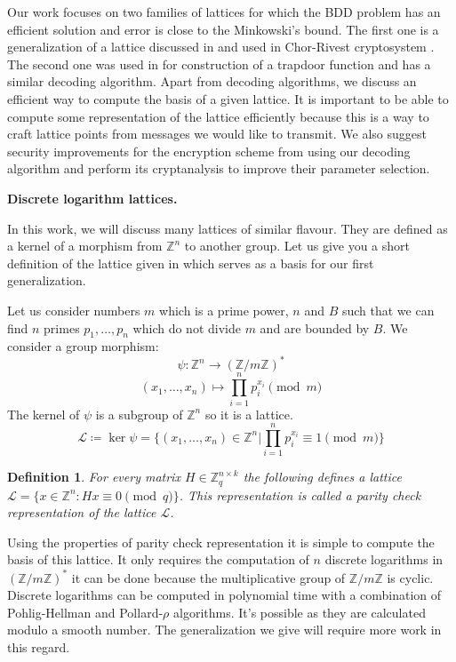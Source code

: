 \documentclass[12pt]{article}
\newcommand{\ZZ}{\mathbb{Z}}
\newcommand{\LL}{\mathcal{L}}
\newtheorem{definition}{Definition}
\begin{document}
Our work focuses on two families of lattices for which the BDD problem has an efficient solution and error is close to the Minkowski's bound. The first one is a generalization of a lattice discussed in \cite{[DP19]} and used in Chor-Rivest cryptosystem \cite{[CR88]}. The second one was used in \cite{[LLXY17]} for construction of a trapdoor function and has a similar decoding algorithm. Apart from decoding algorithms, we discuss an efficient way to compute the basis of a given lattice. It is important to be able to compute some representation of the lattice efficiently because this is a way to craft lattice points from messages we would like to transmit. We also suggest security improvements for the encryption scheme from \cite{[LLXY17]} using our decoding algorithm and perform its cryptanalysis to improve their parameter selection.

\textbf{Discrete logarithm lattices.}

In this work, we will discuss many lattices of similar flavour. They are defined as a kernel of a morphism from $\ZZ^{n}$ to another group. Let us give you a short definition of the lattice given in \cite{[DP19]} which serves as a basis for our first generalization.

Let us consider numbers $m$ which is a prime power, $n$ and $B$ such that we can find $n$ primes $p_{1}, \dots , p_{n}$ which do not divide $m$ and are bounded by $B$. We consider a group morphism:
\[
    \psi : \ZZ^{n} \rightarrow (\ZZ/m\ZZ)^*
\]
\[
    (x_{1}, \dots, x_{n}) \mapsto \prod_{i=1}^{n}p_{i}^{x_{i}} \pmod{m}
\]
The kernel of $\psi$ is a subgroup of $\ZZ^{n}$ so it is a lattice.
\[
    \LL \coloneqq \ker \psi = \{(x_{1}, \dots, x_{n}) \in \ZZ^{n} | \prod_{i=1}^{n}p_{i}^{x_{i}} \equiv 1 \pmod{m}\}
\]

\begin{definition}
For every matrix $H \in \ZZ_{q}^{n \times k}$ the following defines a lattice $\LL = \{x \in \ZZ^{n}: Hx \equiv 0 \pmod{q}\}$. This representation is called a parity check representation of the lattice $\LL$.
\end{definition}

Using the properties of parity check representation it is simple to compute the basis of this lattice. It only requires the computation of $n$ discrete logarithms in $(\ZZ/m\ZZ)^*$ it can be done because the multiplicative group of $\ZZ/m\ZZ$ is cyclic. Discrete logarithms can be computed in polynomial time with a combination of Pohlig-Hellman \cite{[PH78]} and Pollard-$\rho$ \cite{[Pol78]} algorithms. It's possible as they are calculated modulo a smooth number. The generalization we give will require more work in this regard.
\end{document}
